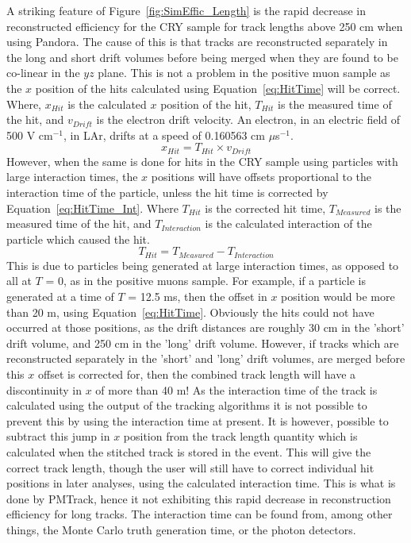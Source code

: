 A striking feature of Figure~\ref{fig:SimEffic_Length} is the rapid decrease in reconstructed efficiency for the CRY sample for track lengths above 250 cm when using Pandora. The cause of this is that tracks are reconstructed separately in the long and short drift volumes before being merged when they are found to be co-linear in the $yz$ plane. This is not a problem in the positive muon sample as the $x$ position of the hits calculated using Equation~\ref{eq:HitTime} will be correct. Where, $x_{Hit}$ is the calculated $x$ position of the hit, $T_{Hit}$ is the measured time of the hit, and $v_{Drift}$ is the electron drift velocity. An electron, in an electric field of 500 V cm$^{-1}$, in LAr, drifts at a speed of 0.160563 cm $\mu$s$^{-1}$.
\begin{equation}
   \label{eq:HitTime}
   x_{Hit} = T_{Hit} \times v_{Drift}
\end{equation}
However, when the same is done for hits in the CRY sample using particles with large interaction times, the $x$ positions will have offsets proportional to the interaction time of the particle, unless the hit time is corrected
by Equation~\ref{eq:HitTime_Int}. Where $T_{Hit}$ is the corrected hit time, $T_{Measured}$ is the measured time of the hit, and $T_{Interaction}$ is the calculated interaction of the particle which caused the hit.
\begin{equation}
   \label{eq:HitTime_Int}
   T_{Hit} = T_{Measured} - T_{Interaction}
\end{equation}
This is due to particles being generated at large interaction times, as opposed to all at $T$ = 0, as in the positive muons sample. For example, if a particle is generated at a time of $T$ = 12.5 ms, then the offset in $x$ position would be more than 20 m, using Equation~\ref{eq:HitTime}. Obviously the hits could not have occurred at those positions, as the drift distances are roughly 30 cm in the 'short' drift volume, and 250 cm in the 'long' drift volume. However, if tracks which are reconstructed separately in the 'short' and 'long' drift volumes, are merged before this $x$ offset is corrected for, then the combined track length will have a discontinuity in $x$ of more than 40 m! As the interaction time of the track is calculated using the output of the tracking algorithms it is not possible to prevent this by using the interaction time at present. It is however, possible to subtract this jump in $x$ position from the track length quantity which is calculated when the stitched track is stored in the event. This will give the correct track length, though the user will still have to correct individual hit positions in later analyses, using the calculated interaction time. This is what is done by PMTrack, hence it not exhibiting this rapid decrease in reconstruction efficiency for long tracks. The interaction time can be found from, among other things, the Monte Carlo truth generation time, or the photon detectors.\\

